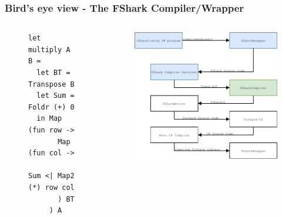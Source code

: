 \documentclass[10pt, compress, usenames, dvipsnames]{beamer}
\begin{document}
\begin{frame}[fragile]
  \frametitle{Bird's eye view - The FShark Compiler/Wrapper}
\begin{columns}[t] %
\begin{column}{.38\textwidth}
  \begin{figure}
\begin{verbatim}
let multiply A B =
  let BT = Transpose B
  let Sum = Foldr (+) 0
  in Map (fun row ->
       Map (fun col -> 
         Sum <| Map2 (*) row col
       ) BT
     ) A
\end{verbatim}
  \end{figure}
\end{column}
\hfill
\begin{column}{.60\textwidth}
  \begin{figure}
    \includegraphics[scale=0.7]{./images/pipeline/pipeline5}
  \end{figure}
\end{column}
\end{columns}
\end{frame}
\end{document}
